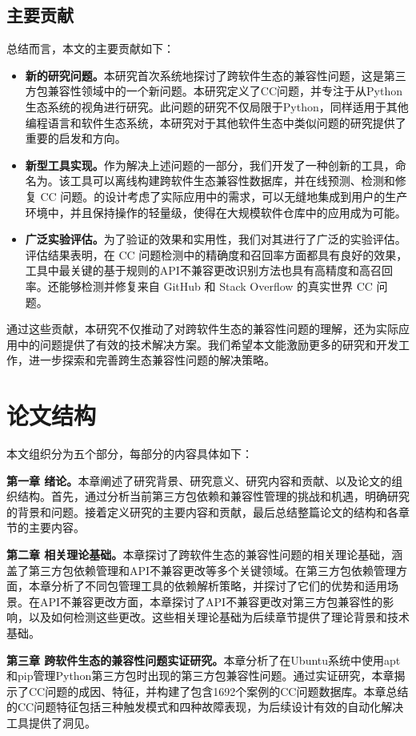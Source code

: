 \subsection{主要贡献}
总结而言，本文的主要贡献如下： 
\begin{itemize}
	\item \textbf{新的研究问题。}本研究首次系统地探讨了跨软件生态的兼容性问题，这是第三方包兼容性领域中的一个新问题。本研究定义了CC问题，并专注于从Python生态系统的视角进行研究。此问题的研究不仅局限于Python，同样适用于其他编程语言和软件生态系统，本研究对于其他软件生态中类似问题的研究提供了重要的启发和方向。
	\item \textbf{新型工具实现。}作为解决上述问题的一部分，我们开发了一种创新的工具，命名为\tool{}。该工具可以离线构建跨软件生态兼容性数据库，并在线预测、检测和修复 CC 问题。\tool{}的设计考虑了实际应用中的需求，可以无缝地集成到用户的生产环境中，并且保持操作的轻量级，使得在大规模软件仓库中的应用成为可能。
	\item \textbf{广泛实验评估。}为了验证\tool{}的效果和实用性，我们对其进行了广泛的实验评估。评估结果表明，\tool{}在 CC 问题检测中的精确度和召回率方面都具有良好的效果，工具中最关键的基于规则的API不兼容更改识别方法也具有高精度和高召回率。\tool{}还能够检测并修复来自 GitHub 和 Stack Overflow 的真实世界 CC 问题。
\end{itemize}
通过这些贡献，本研究不仅推动了对跨软件生态的兼容性问题的理解，还为实际应用中的问题提供了有效的技术解决方案。我们希望本文能激励更多的研究和开发工作，进一步探索和完善跨生态兼容性问题的解决策略。

\section{论文结构}
本文组织分为五个部分，每部分的内容具体如下：

\textbf{第一章 绪论。}本章阐述了研究背景、研究意义、研究内容和贡献、以及论文的组织结构。首先，通过分析当前第三方包依赖和兼容性管理的挑战和机遇，明确研究的背景和问题。接着定义研究的主要内容和贡献，最后总结整篇论文的结构和各章节的主要内容。

\textbf{第二章 相关理论基础。}本章探讨了跨软件生态的兼容性问题的相关理论基础，涵盖了第三方包依赖管理和API不兼容更改等多个关键领域。在第三方包依赖管理方面，本章分析了不同包管理工具的依赖解析策略，并探讨了它们的优势和适用场景。在API不兼容更改方面，本章探讨了API不兼容更改对第三方包兼容性的影响，以及如何检测这些更改。这些相关理论基础为后续章节提供了理论背景和技术基础。

\textbf{第三章 跨软件生态的兼容性问题实证研究。}本章分析了在Ubuntu系统中使用apt和pip管理Python第三方包时出现的第三方包兼容性问题。通过实证研究，本章揭示了CC问题的成因、特征，并构建了包含1692个案例的CC问题数据库。本章总结的CC问题特征包括三种触发模式和四种故障表现，为后续设计有效的自动化解决工具提供了洞见。

